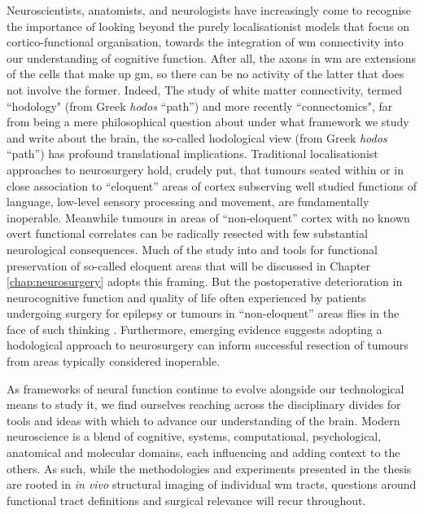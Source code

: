 \documentclass[12pt,phd,a4paper,twoside]{ucl_thesis}
\providecommand{\DIFaddtex}[1]{{\protect\color{blue} \sf #1}} %
\providecommand{\DIFdeltex}[1]{{\protect\color{red} \scriptsize #1}} %
\providecommand{\DIFaddbegin}{} %
\providecommand{\DIFaddend}{} %
\providecommand{\DIFdelbegin}{} %
\providecommand{\DIFdelend}{} %
\providecommand{\DIFadd}[1]{\texorpdfstring{\DIFaddtex{#1}}{#1}} %
\providecommand{\DIFdel}[1]{\texorpdfstring{\DIFdeltex{#1}}{}} %
\newcommand{\DIFscaledelfig}{0.5}
\newlength{\DIFdelgraphicswidth} %
\newlength{\DIFdelgraphicsheight} %
\newcommand{\DIFaddincludegraphics}[2][]{{\color{blue}\fbox{\DIFOincludegraphics[#1]{#2}}}} %
\newcommand{\DIFdelincludegraphics}[2][]{%
\sbox{\DIFdelgraphicsbox}{\DIFOincludegraphics[#1]{#2}}%
\settoboxwidth{\DIFdelgraphicswidth}{\DIFdelgraphicsbox} %
\settoboxtotalheight{\DIFdelgraphicsheight}{\DIFdelgraphicsbox} %
\scalebox{\DIFscaledelfig}{%
\parbox[b]{\DIFdelgraphicswidth}{\usebox{\DIFdelgraphicsbox}\\[-\baselineskip] \rule{\DIFdelgraphicswidth}{0em}}\llap{\resizebox{\DIFdelgraphicswidth}{\DIFdelgraphicsheight}{%
\setlength{\unitlength}{\DIFdelgraphicswidth}%
\begin{picture}(1,1)%
\thicklines\linethickness{2pt} %
{\color[rgb]{1,0,0}\put(0,0){\framebox(1,1){}}}%
{\color[rgb]{1,0,0}\put(0,0){\line( 1,1){1}}}%
{\color[rgb]{1,0,0}\put(0,1){\line(1,-1){1}}}%
\end{picture}%
}\hspace*{3pt}}} %
} %
\DeclareRobustCommand{\DIFaddbegin}{\DIFOaddbegin \let\includegraphics\DIFaddincludegraphics} %
\DeclareRobustCommand{\DIFaddend}{\DIFOaddend \let\includegraphics\DIFOincludegraphics} %
\DeclareRobustCommand{\DIFdelbegin}{\DIFOdelbegin \let\includegraphics\DIFdelincludegraphics} %
\DeclareRobustCommand{\DIFdelend}{\DIFOaddend \let\includegraphics\DIFOincludegraphics} %
\begin{document}
Neuroscientists, anatomists, and neurologists have increasingly come to recognise the importance of looking beyond the purely localisationist models that focus on cortico-functional organisation, towards the integration of \gls{wm} connectivity into our understanding of cognitive function\autocite{ffytche2005,Catani2007}.
After all, the axons in \gls{wm} are extensions of the cells that make up \gls{gm}, so there can be no activity of the latter that does not involve the former.
\DIFdelbegin \DIFdel{Indeed, }\DIFdelend \DIFaddbegin \DIFadd{The study of white matter connectivity, termed ``hodology" (from Greek \textit{hodos} ``path'') and more recently ``connectomics", }\DIFaddend far from being a mere philosophical question about under what framework we study and write about the brain, \DIFdelbegin \DIFdel{the so-called hodological view (from Greek \textit{hodos} ``path'') }\DIFdelend has profound translational implications.
Traditional localisationist approaches to neurosurgery hold, crudely put, that tumours seated within or in close association to ``eloquent'' areas of cortex subserving well studied functions of language, low-level sensory processing and movement, are fundamentally inoperable.
Meanwhile tumours in areas of ``non-eloquent'' cortex with no known overt functional correlates can be radically resected with few substantial neurological consequences.
Much of the study into and tools for functional preservation of so-called eloquent areas that will be discussed in Chapter \ref{chap:neurosurgery} adopts this framing.
But the postoperative deterioration in neurocognitive function and quality of life often experienced by patients undergoing surgery for epilepsy or tumours in ``non-eloquent'' areas flies in the face of such thinking
\autocite{Satoer2017,Mandonnet2017a,Rijnen2019,Herbet2019,Vigren2020a,Dadario2021}.
Furthermore, emerging evidence suggests adopting a hodological approach to neurosurgery can inform successful resection of tumours from areas typically considered inoperable\autocite{Dadario2021,DeBenedictis2011b,Suzuki2023}.

As frameworks of neural function continue to evolve alongside our technological means to study it, we find ourselves reaching across the disciplinary divides for tools and ideas with which to advance our understanding of the brain.
Modern neuroscience is a blend of cognitive, systems, computational, psychological, anatomical and molecular domains, each influencing and adding context to the others.
As such, while the methodologies and experiments presented in the thesis are rooted in \textit{in vivo} structural imaging of individual \gls{wm} tracts, questions around functional tract definitions and surgical relevance will recur throughout.
\end{document}
